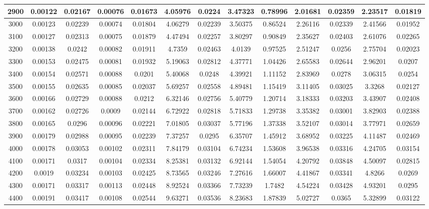 \documentclass[conference]{IEEEtran}
\begin{document}
\begin{table}[!ht]
\begin{tabular}{|c|c|c|c|c|c|c|c|c|c|c|c|c|}
\hline
2900 & 0.00122 & 0.02167 & 0.00076 & 0.01673 & 4.05976 & 0.0224 & 3.47323 & 0.78996 &2.01681 & 0.02359 & 2.23517 & 0.01819 \\
\hline
3000 & 0.00123 & 0.02239 & 0.00074 & 0.01804 & 4.06279 & 0.02239 & 3.50375 & 0.86524 &2.26116 & 0.02339 & 2.41566 & 0.01952 \\
\hline
3100 & 0.00127 & 0.02313 & 0.00075 & 0.01879 & 4.47494 & 0.02257 & 3.80297 & 0.90849 &2.35627 & 0.02403 & 2.61076 & 0.02265 \\
\hline
3200 & 0.00138 & 0.0242 & 0.00082 & 0.01911 & 4.7359 & 0.02463 & 4.0139 & 0.97525 &2.51247 & 0.0256 & 2.75704 & 0.02023 \\
\hline
3300 & 0.00153 & 0.02475 & 0.00081 & 0.01932 & 5.19063 & 0.02812 & 4.37771 & 1.04426 &2.65583 & 0.02644 & 2.96201 & 0.0207 \\
\hline
3400 & 0.00154 & 0.02571 & 0.00088 & 0.0201 & 5.40068 & 0.0248 & 4.39921 & 1.11152 &2.83969 & 0.0278 & 3.06315 & 0.0254 \\
\hline
3500 & 0.00155 & 0.02635 & 0.00085 & 0.02037 & 5.69257 & 0.02558 & 4.89481 & 1.15419 &3.11405 & 0.03025 & 3.3268 & 0.02127 \\
\hline
3600 & 0.00166 & 0.02729 & 0.00088 & 0.0212 & 6.32146 & 0.02756 & 5.40779 & 1.20714 &3.18333 & 0.03203 & 3.43907 & 0.02408 \\
\hline
3700 & 0.00162 & 0.02726 & 0.0009 & 0.02144 & 6.72922 & 0.02818 & 5.71833 & 1.29738 &3.35382 & 0.03001 & 3.82903 & 0.02388 \\
\hline
3800 & 0.00165 & 0.0296 & 0.00096 & 0.02221 & 7.01805 & 0.03037 & 5.77196 & 1.37338 &3.52107 & 0.03014 & 3.77971 & 0.02659 \\
\hline
3900 & 0.00179 & 0.02988 & 0.00095 & 0.02239 & 7.37257 & 0.0295 & 6.35707 & 1.45912 &3.68952 & 0.03225 & 4.11487 & 0.02469 \\
\hline
4000 & 0.00178 & 0.03053 & 0.00102 & 0.02311 & 7.84179 & 0.03104 & 6.74234 & 1.53608 &3.96538 & 0.03316 & 4.24705 & 0.03154 \\
\hline
4100 & 0.00171 & 0.0317 & 0.00104 & 0.02334 & 8.25381 & 0.03132 & 6.92144 & 1.54054 &4.20792 & 0.03848 & 4.50097 & 0.02815 \\
\hline
4200 & 0.0019 & 0.03234 & 0.00103 & 0.02425 & 8.73565 & 0.03246 & 7.27616 & 1.66007 &4.41867 & 0.03341 & 4.8266 & 0.0269 \\
\hline
4300 & 0.00171 & 0.03317 & 0.00113 & 0.02448 & 8.92524 & 0.03366 & 7.73239 & 1.7482 &4.54224 & 0.03428 & 4.93201 & 0.0295 \\
\hline
4400 & 0.00191 & 0.03417 & 0.00108 & 0.02544 & 9.63271 & 0.03536 & 8.23683 & 1.87839 &5.02727 & 0.0365 & 5.32899 & 0.03122 \\

\end{tabular}
\end{table}
\end{document}
